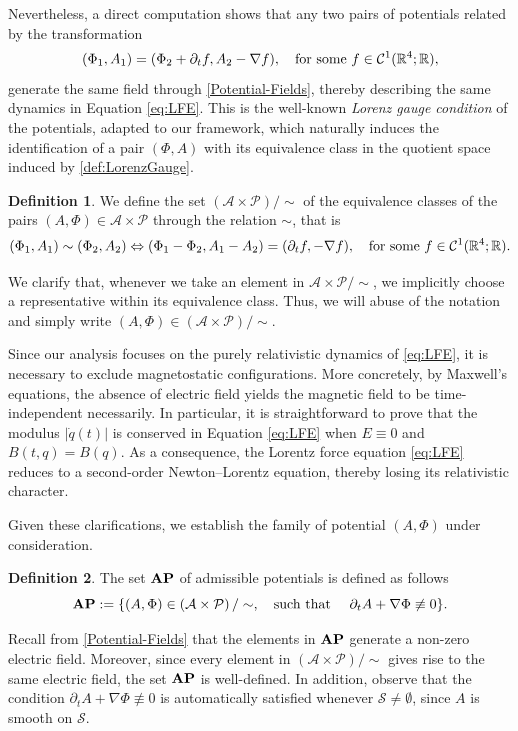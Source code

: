 \documentclass{article}
\newcommand{\R}{\mathbb{R}}
\newcommand{\boA}{\mathcal{A}}
\newcommand{\boP}{\mathcal{P}}
\newcommand{\boS}{\mathcal{S}}
\newcommand{\dq}{\dot{q}}
\newcommand{\AP}{\textnormal{\textbf{AP}}}
\theoremstyle{definition}
\newtheorem{definition}{Definition}[section]
\begin{document}
Nevertheless, a direct computation shows that any two pairs of potentials related by the transformation
\begin{equation}\label{def:LorenzGauge}
    (\Phi_1,A_1)=(\Phi_2+\partial_t f,A_2-\nabla f),\quad\hbox{for some }f\in\mathcal{C}^1(\R^4;\R),
\end{equation}
generate the same field through \eqref{Potential-Fields}, thereby describing the same dynamics in Equation \eqref{eq:LFE}. This is the well-known \textsl{Lorenz gauge condition} of the potentials, adapted to our framework, which naturally induces the identification of a pair $(\Phi,A)$ with its equivalence class in the quotient space induced by \eqref{def:LorenzGauge}.
\begin{definition}
    We define the set $\left(\boA\times\boP\right)/\sim$ of the equivalence classes of the pairs $(A,\Phi)\in\boA\times\boP$ through the relation $\sim$, that is
\begin{equation}\label{eq:equivalenceclass1}
	(\Phi_1,A_1)\sim (\Phi_2,A_2)\Leftrightarrow(\Phi_1-\Phi_2,A_1-A_2)=(\partial_t f,-\nabla f),\quad\hbox{for some }f\in\mathcal{C}^1(\R^4;\R).
\end{equation}
\end{definition}
We clarify that, whenever we take an element in $\boA\times\boP/\sim$, we implicitly choose a representative within its equivalence class. Thus, we will abuse of the notation and simply write $(A,\Phi)\in(\boA\times\boP)/\sim$. 

Since our analysis focuses on the purely relativistic dynamics of \eqref{eq:LFE}, it is necessary to exclude magnetostatic configurations. More concretely, by Maxwell's equations, the absence of electric field yields the magnetic field to be time-independent necessarily. In particular, it is straightforward to prove that the modulus $|\dq(t)|$ is conserved in Equation \eqref{eq:LFE} when $E\equiv0$ and $B(t,q)=B(q)$. As a consequence, the Lorentz force equation \eqref{eq:LFE} reduces to a second-order Newton–Lorentz equation, thereby losing its relativistic character.

Given these clarifications, we establish the family of potential $(A,\Phi)$ under consideration.

\begin{definition}
The set $\AP$ of admissible potentials is defined as follows 
\begin{equation}\label{cond:admissible}
\AP:=\{(A,\Phi)\in\left(\boA\times\boP\right)/\sim,\quad\hbox{such that }\quad \partial_t A + \nabla \Phi\not\equiv 0\}.
	\end{equation}
\end{definition}
Recall from \eqref{Potential-Fields} that the elements in $\AP$ generate a non-zero electric field. Moreover, since every element in $(\boA\times\boP)/\sim$ gives rise to the same electric field, the set $\AP$ is well-defined. In addition, observe that the condition $\partial_t A + \nabla\Phi\not\equiv 0$ is automatically satisfied whenever $\boS\not=\emptyset$, since $A$ is smooth on $\boS$.
\end{document}
